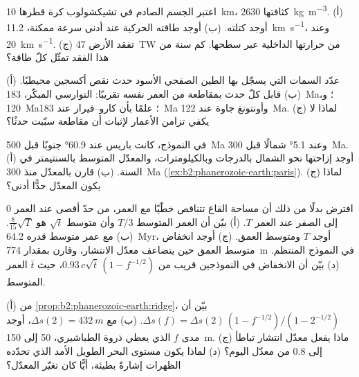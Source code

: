 \begin{exercise}[$\star\star$]\label{exo:b2:phanerozoic-earth:7}
اعتبر الجسم الصادم في تشيكشولوب كرة قطرها \qty{10}{km}، كثافتها
\qty{2630}{kg.m^{-3}}. (أ) أوجد كتلته. (ب) أوجد طاقته الحركية عند أدنى سرعة
ممكنة، \qty{11.2}{km.s^{-1}}، وعند \qty{20}{km.s^{-1}}. (ج) تفقد الأرض \qty{47}{TW} من
حرارتها الداخلية عبر سطحها. كم سنة من هذا الفقد تمثّل كلّ طاقة؟
\end{exercise}

\begin{exercise}[$\star\star$]\label{exo:b2:phanerozoic-earth:8}
(أ) عدّد السمات التي يسجّل بها الطين الصفحي الأسود حدث نقص أكسجين محيطيًا. (ب) قابل كلّ
حدث بمقاطعة من العمر نفسه تقريبًا: التوارسي المبكّر، \qty{183}{Ma}؛ و،
\qty{120}{Ma}؛ علمًا بأن كارو--فيرار عند \qty{183}{Ma} وأونتونغ جاوة عند \qty{122}{Ma}. (ج) لماذا لا
يكفي تزامن الأعمار لإثبات أن مقاطعة سبّبت حدثًا؟
\end{exercise}

\begin{exercise}[$\star\star$]\label{exo:b2:phanerozoic-earth:9}
في النموذج، كانت باريس عند \ang{60.9} جنوبًا قبل \qty{500}{Ma} وعند \ang{5.1} شمالًا قبل \qty{300}{Ma}.
(أ) أوجد إزاحتها نحو الشمال بالدرجات وبالكيلومترات، والمعدّل المتوسط
بالسنتيمتر في السنة. (ب) قارن بالمعدّل منذ \qty{300}{Ma}
(\cref{ex:b2:phanerozoic-earth:paris}). (ج) لماذا يكون المعدّل حدًّا أدنى؟
\end{exercise}

\begin{exercise}[$\star\star\star$]\label{exo:b2:phanerozoic-earth:10}
افترض بدلًا من ذلك أن مساحة القاع تتناقص خطّيًا مع العمر، من حدّ أقصى عند العمر 0 إلى الصفر
عند العمر $T$. (أ) بيّن أن العمر المتوسط $T/3$ وأن متوسط $\sqrt t$ هو
$\tfrac{8}{15}\sqrt T$. (ب) مع عمر متوسط قدره \qty{64.2}{Myr}، أوجد $T$ ومتوسط العمق. (ج)
أوجد انخفاض متوسط العمق حين يتضاعف معدّل الانتشار، وقارن بمقدار
\qty{774}{m} في النموذج المنتظم. (د) بيّن أن الانخفاض في النموذجين قريب من $0.93\,c\sqrt{\bar
t}\,(1 - f^{-1/2})$، حيث $\bar t$ العمر المتوسط.
\end{exercise}

\begin{exercise}[$\star\star\star$]\label{exo:b2:phanerozoic-earth:11}
(أ) من \cref{prop:b2:phanerozoic-earth:ridge}، بيّن أن $\Delta s(f) = \Delta s(2)\,(1 -
f^{-1/2})/(1 - 2^{-1/2})$. (ب) مع $\Delta s(2) = \qty{432}{m}$، أوجد مدى $f$ الذي
يعطي ذروة الطباشيري، 50 إلى \qty{150}{m}. (ج) ماذا يفعل معدّل انتشار تباطأ إلى 0.8 من
معدّل اليوم؟ (د) لماذا يكون مستوى البحر الطويل الأمد الذي تحدّده الظهرات إشارةً بطيئة، أيًّا كان تغيّر
المعدّل؟
\end{exercise}

